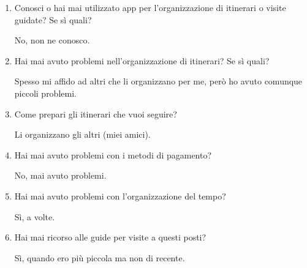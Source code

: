 
\begin{enumerate}

\item Conosci o hai mai utilizzato app per l'organizzazione di itinerari o visite guidate? Se sì quali?

No, non ne conosco.

\item Hai mai avuto problemi nell'organizzazione di itinerari? Se sì quali?

Spesso mi affido ad altri che li organizzano per me, però ho avuto comunque piccoli problemi.

\item Come prepari gli itinerari che vuoi seguire?

Li organizzano gli altri (miei amici).

\item Hai mai avuto problemi con i metodi di pagamento?

No, mai avuto problemi.

\item Hai mai avuto problemi con l'organizzazione del tempo?

Sì, a volte.

\item Hai mai ricorso alle guide per visite a questi posti?

Sì, quando ero più piccola ma non di recente.

\end{enumerate}


